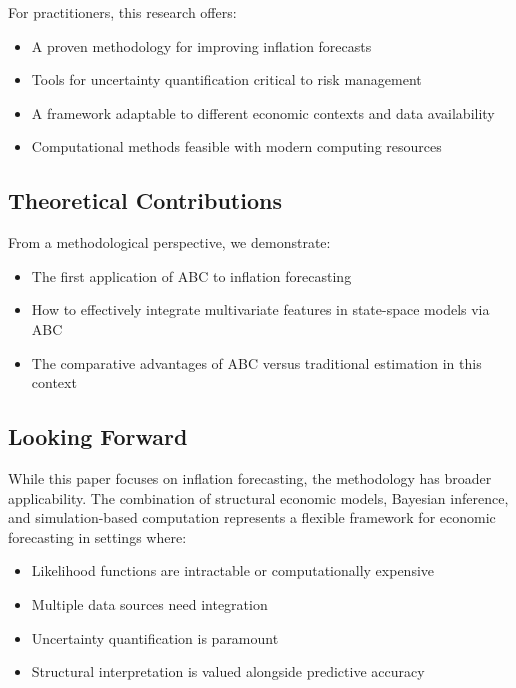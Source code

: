 For practitioners, this research offers:

\begin{itemize}
    \item A proven methodology for improving inflation forecasts
    \item Tools for uncertainty quantification critical to risk management
    \item A framework adaptable to different economic contexts and data availability
    \item Computational methods feasible with modern computing resources
\end{itemize}

\subsection{Theoretical Contributions}

From a methodological perspective, we demonstrate:

\begin{itemize}
    \item The first application of ABC to inflation forecasting
    \item How to effectively integrate multivariate features in state-space models via ABC
    \item The comparative advantages of ABC versus traditional estimation in this context
\end{itemize}

\subsection{Looking Forward}

While this paper focuses on inflation forecasting, the methodology has broader applicability. The combination of structural economic models, Bayesian inference, and simulation-based computation represents a flexible framework for economic forecasting in settings where:

\begin{itemize}
    \item Likelihood functions are intractable or computationally expensive
    \item Multiple data sources need integration
    \item Uncertainty quantification is paramount
    \item Structural interpretation is valued alongside predictive accuracy
\end{itemize}


